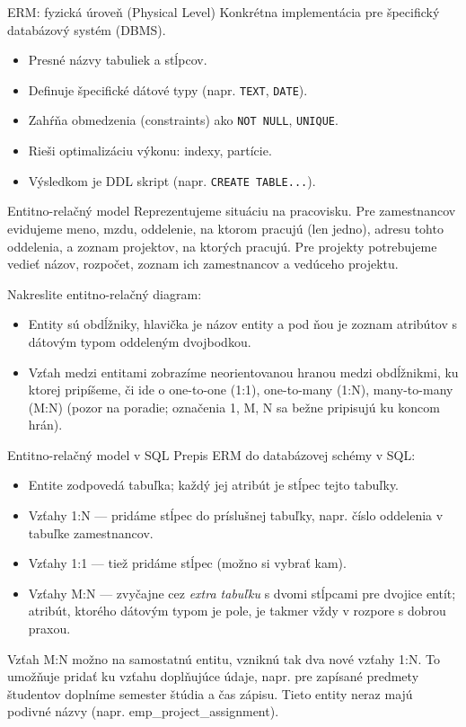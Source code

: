 \documentclass[12pt]{beamer}
\begin{document}
\begin{frame}{ERM: fyzická úroveň (Physical Level)}
Konkrétna implementácia pre špecifický databázový systém (DBMS).
\begin{itemize}
    \item Presné názvy tabuliek a stĺpcov.
    \item Definuje špecifické dátové typy (napr. \texttt{TEXT}, \texttt{DATE}).
    \item Zahŕňa obmedzenia (constraints) ako \texttt{NOT NULL}, \texttt{UNIQUE}.
    \item Rieši optimalizáciu výkonu: indexy, partície.
    \item Výsledkom je DDL skript (napr. \texttt{CREATE TABLE...}).
\end{itemize}
\end{frame}


\begin{frame}[fragile]{Entitno-relačný model}
Reprezentujeme situáciu na pracovisku. Pre zamestnancov evidujeme meno, mzdu,
oddelenie, na ktorom pracujú (len jedno), adresu tohto oddelenia, a zoznam projektov, na ktorých pracujú.
Pre projekty potrebujeme vedieť názov, rozpočet, zoznam ich zamestnancov a vedúceho projektu.

Nakreslite entitno-relačný diagram:
\begin{itemize}
\item Entity sú obdĺžniky, hlavička je názov entity a pod ňou je zoznam atribútov s dátovým typom oddeleným dvojbodkou.
\item Vzťah medzi entitami zobrazíme neorientovanou hranou medzi obdĺžnikmi, ku ktorej pripíšeme,
či ide o one-to-one (1:1), one-to-many (1:N), many-to-many (M:N)
(pozor na poradie; označenia 1, M, N sa bežne pripisujú ku koncom hrán).
\end{itemize}
\end{frame}

\begin{frame}[fragile]{Entitno-relačný model v SQL}
Prepis ERM do databázovej schémy v SQL:
\begin{itemize}
\item Entite zodpovedá tabuľka; každý jej atribút je stĺpec tejto tabuľky.
\item Vzťahy 1:N --- pridáme stĺpec do príslušnej tabuľky, napr. číslo oddelenia v tabuľke zamestnancov.
\item Vzťahy 1:1 --- tiež pridáme stĺpec (možno si vybrať kam).
\item Vzťahy M:N --- zvyčajne cez \emph{extra tabuľku} s dvomi stĺpcami pre dvojice entít;
atribút, ktorého dátovým typom je pole, je takmer vždy v rozpore s dobrou praxou.
\end{itemize}
Vzťah M:N možno  na samostatnú entitu, vzniknú tak dva nové vzťahy 1:N.
To umožňuje pridať ku vzťahu doplňujúce údaje, napr. pre zapísané predmety študentov doplníme semester štúdia a čas zápisu.
Tieto  entity neraz majú podivné názvy (napr. emp\_project\_assignment).
\end{frame}
\end{document}
